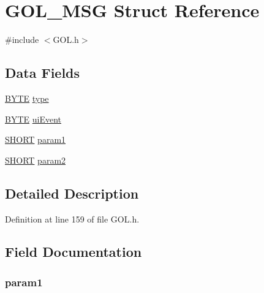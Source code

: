 \hypertarget{struct_g_o_l___m_s_g}{}\section{G\+O\+L\+\_\+\+M\+S\+G Struct Reference}
\label{struct_g_o_l___m_s_g}


{\ttfamily \#include $<$G\+O\+L.\+h$>$}

\subsection*{Data Fields}
\begin{DoxyCompactItemize}
\item 
\hyperlink{_generic_type_defs_8h_a4ae1dab0fb4b072a66584546209e7d58}{B\+Y\+T\+E} \hyperlink{struct_g_o_l___m_s_g_aab7cf12125f16245546ef7411994ebb9}{type}
\item 
\hyperlink{_generic_type_defs_8h_a4ae1dab0fb4b072a66584546209e7d58}{B\+Y\+T\+E} \hyperlink{struct_g_o_l___m_s_g_a8e419945a76e0e2df9dcb35982fec6b1}{ui\+Event}
\item 
\hyperlink{_generic_type_defs_8h_ae9bb25d3afecf3bfab0fbe3c22c2050f}{S\+H\+O\+R\+T} \hyperlink{struct_g_o_l___m_s_g_a16d02b77c76947449ce9eb6edd0ab0b3}{param1}
\item 
\hyperlink{_generic_type_defs_8h_ae9bb25d3afecf3bfab0fbe3c22c2050f}{S\+H\+O\+R\+T} \hyperlink{struct_g_o_l___m_s_g_aae81f2ac2c75c0670e840e58cb7d206f}{param2}
\end{DoxyCompactItemize}


\subsection{Detailed Description}


Definition at line 159 of file G\+O\+L.\+h.



\subsection{Field Documentation}
\hypertarget{struct_g_o_l___m_s_g_a16d02b77c76947449ce9eb6edd0ab0b3}{}
\subsubsection[{param1}]{ param1}\label{struct_g_o_l___m_s_g_a16d02b77c76947449ce9eb6edd0ab0b3}


